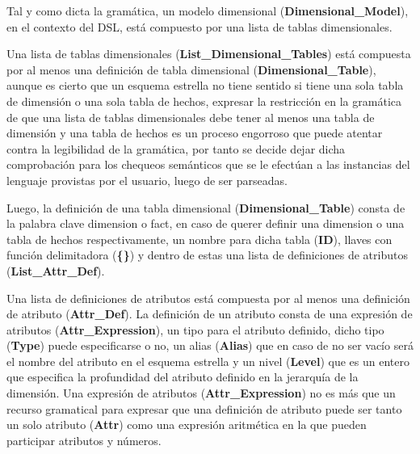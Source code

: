 
Tal y como dicta la gramática, un modelo dimensional (\textbf{Dimensional\_Model}), 
en el contexto del DSL, est\'a compuesto por una lista de tablas 
dimensionales. 

Una lista de tablas dimensionales (\textbf{List\_Dimensional\_Tables}) est\'a compuesta por al menos 
una definici\'on de tabla dimensional 
(\textbf{Dimensional\_Table}), aunque es cierto que un esquema estrella no tiene sentido si tiene una sola tabla 
de dimensi\'on o una sola tabla de hechos, expresar la restricci\'on en la gramática de que una lista de 
tablas dimensionales debe tener al menos una tabla de dimensi\'on y una tabla de hechos es un proceso 
engorroso que puede atentar contra la legibilidad de la gramática, por tanto se decide dejar dicha 
comprobaci\'on para los chequeos sem\'anticos que se le efect\'uan a las instancias del lenguaje provistas 
por el usuario, luego de ser parseadas. 

Luego, la 
definición de una tabla dimensional (\textbf{Dimensional\_Table}) consta de la palabra clave dimension o fact, 
en caso de querer definir una dimension o una tabla de hechos respectivamente, un nombre para dicha tabla 
(\textbf{ID}), llaves con funci\'on delimitadora (\textbf{\{\}}) y dentro de estas una lista de definiciones de atributos
(\textbf{List\_Attr\_Def}). 

Una lista de definiciones de atributos est\'a compuesta por al menos una definición de atributo (\textbf{Attr\_Def}). 
La definición de un atributo consta de una expresión de atributos (\textbf{Attr\_Expression}), un tipo para el atributo 
definido, dicho tipo (\textbf{Type}) puede especificarse o no, un alias (\textbf{Alias}) que en caso de no ser vacío ser\'a el nombre del 
atributo en el esquema estrella y un nivel (\textbf{Level}) que es un entero que especifica la profundidad 
del atributo definido en la jerarqu\'ia de la dimensi\'on. Una expresión de atributos (\textbf{Attr\_Expression}) no es m\'as que 
un recurso gramatical para expresar que una definición de atributo puede ser tanto un solo atributo (\textbf{Attr})
como una expresi\'on aritm\'etica en la que pueden participar atributos y n\'umeros. 

